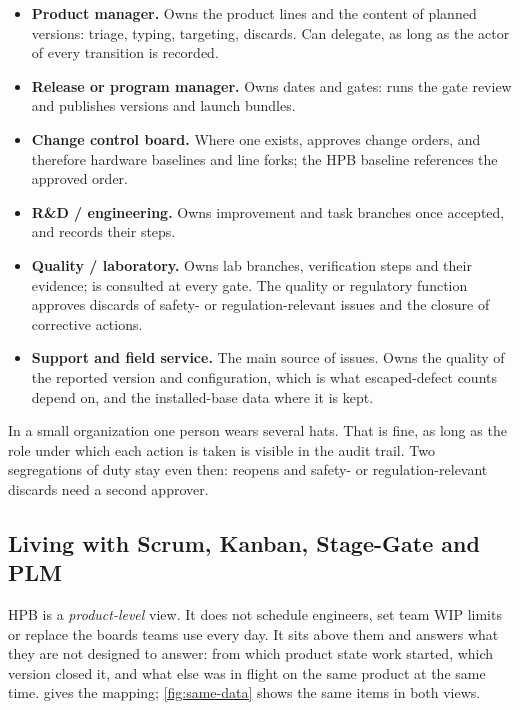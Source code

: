 \begin{itemize}[leftmargin=*,itemsep=2pt]
  \item \textbf{Product manager.} Owns the product lines and the content of
    planned versions: triage, typing, targeting, discards. Can delegate,
    as long as the actor of every transition is recorded.
  \item \textbf{Release or program manager.} Owns dates and gates: runs the
    gate review and publishes versions and launch bundles.
  \item \textbf{Change control board.} Where one exists, approves change
    orders, and therefore hardware baselines and line forks; the HPB
    baseline references the approved order.
  \item \textbf{R\&D / engineering.} Owns improvement and task branches
    once accepted, and records their steps.
  \item \textbf{Quality / laboratory.} Owns lab branches, verification
    steps and their evidence; is consulted at every gate. The quality or
    regulatory function approves discards of safety- or
    regulation-relevant issues and the closure of corrective actions.
  \item \textbf{Support and field service.} The main source of issues.
    Owns the quality of the reported version and configuration, which is
    what escaped-defect counts depend on, and the installed-base data
    where it is kept.
\end{itemize}

\noindent In a small organization one person wears several hats. That is
fine, as long as the role under which each action is taken is visible in
the audit trail. Two segregations of duty stay even then: reopens and
safety- or regulation-relevant discards need a second approver.

\subsection{Living with Scrum, Kanban, Stage-Gate and PLM}
\label{subsec:method-coexistence}

HPB is a \emph{product-level} view. It does not schedule engineers, set
team WIP limits or replace the boards teams use every day. It sits above
them and answers what they are not designed to answer: from which product
state work started, which version closed it, and what else was in flight
on the same product at the same time.  gives the
mapping; \cref{fig:same-data} shows the same items in both views.

